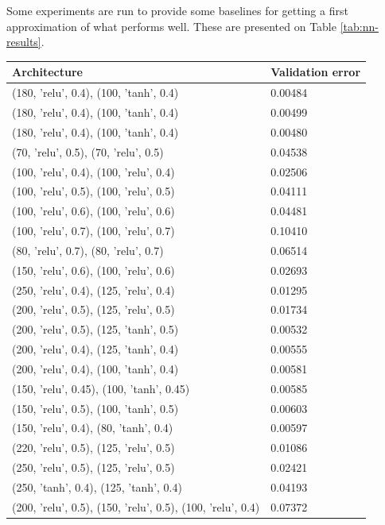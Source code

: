 Some experiments are run to provide some baselines for getting a first approximation of what performs well. These are presented on Table \ref{tab:nn-results}.

\begin{table}[h!]
    \centering
    \begin{tabular}{|p{}|p{}|}
        \hline
        Architecture & Validation error \\ \hline
        (180, 'relu', 0.4), (100, 'tanh', 0.4) & 0.00484 \\
        (180, 'relu', 0.4), (100, 'tanh', 0.4) & 0.00499 \\
        (180, 'relu', 0.4), (100, 'tanh', 0.4) & 0.00480 \\
        (70, 'relu', 0.5), (70, 'relu', 0.5) & 0.04538 \\
        (100, 'relu', 0.4), (100, 'relu', 0.4) & 0.02506 \\
        (100, 'relu', 0.5), (100, 'relu', 0.5) & 0.04111 \\
        (100, 'relu', 0.6), (100, 'relu', 0.6) & 0.04481 \\
        (100, 'relu', 0.7), (100, 'relu', 0.7) & 0.10410 \\
        (80, 'relu', 0.7), (80, 'relu', 0.7) & 0.06514 \\
        (150, 'relu', 0.6), (100, 'relu', 0.6) & 0.02693 \\
        (250, 'relu', 0.4), (125, 'relu', 0.4) & 0.01295 \\
        (200, 'relu', 0.5), (125, 'relu', 0.5) & 0.01734 \\
        (200, 'relu', 0.5), (125, 'tanh', 0.5) & 0.00532 \\
        (200, 'relu', 0.4), (125, 'tanh', 0.4) & 0.00555 \\
        (200, 'relu', 0.4), (100, 'tanh', 0.4) & 0.00581 \\
        (150, 'relu', 0.45), (100, 'tanh', 0.45) & 0.00585 \\
        (150, 'relu', 0.5), (100, 'tanh', 0.5) & 0.00603 \\
        (150, 'relu', 0.4), (80, 'tanh', 0.4) & 0.00597 \\
        (220, 'relu', 0.5), (125, 'relu', 0.5) & 0.01086 \\
        (250, 'relu', 0.5), (125, 'relu', 0.5) & 0.02421 \\
        (250, 'tanh', 0.4), (125, 'tanh', 0.4) & 0.04193 \\
        (200, 'relu', 0.5), (150, 'relu', 0.5), (100, 'relu', 0.4) & 0.07372 \\

\end{tabular}
\end{table}

